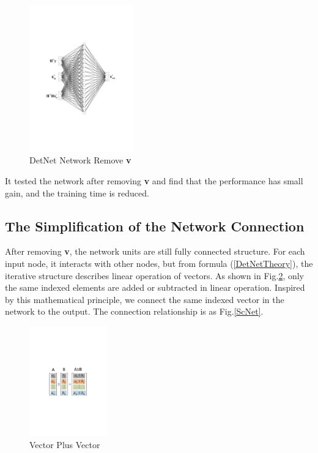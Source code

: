 \documentclass[conference]{IEEEtran}
\begin{document}
\begin{figure}[ht]
  \centering
  \includegraphics[width=0.4\textwidth]{DetNetRemoveV.pdf}
  \caption{DetNet Network Remove \textbf{v}}
  \label{DetNetRemoveV}
\end{figure}

It tested the network after removing \textbf{v} and find that the performance has small gain, and the training time is reduced.

\subsection{The Simplification of the Network Connection} After removing \textbf{v}, the network units are still fully connected structure. For each input node, it interacts with other nodes, but from formula (\ref{DetNetTheory}), the iterative structure describes linear operation of vectors. As shown in Fig.\ref{vector}, only the same indexed elements are added or subtracted in linear operation. Inspired by this mathematical principle, we connect the same indexed vector in the network to the output. The connection relationship is as Fig.\ref{ScNet}.

\begin{figure}[ht]
  \centering
  \includegraphics[width=0.3\textwidth]{vectorPlus.pdf}
  \caption{Vector Plus Vector}
  \label{vector}
\end{figure}
\end{document}
